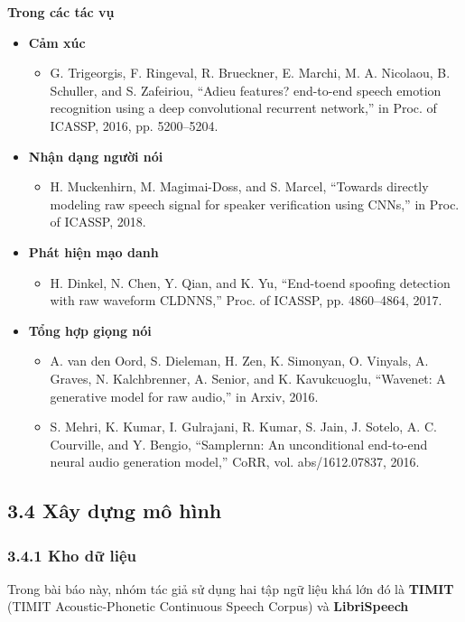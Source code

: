 \documentclass{article}
\begin{document}
	\textbf{Trong các tác vụ}
	\begin{itemize}
		\item \textbf{Cảm xúc}
		\begin{itemize}
			\item G. Trigeorgis, F. Ringeval, R. Brueckner, E. Marchi,
			M. A. Nicolaou, B. Schuller, and S. Zafeiriou, “Adieu
			features? end-to-end speech emotion recognition using
			a deep convolutional recurrent network,” in Proc. of
			ICASSP, 2016, pp. 5200–5204.
		\end{itemize}
		\item \textbf{Nhận dạng người nói}
		\begin{itemize}
			\item H. Muckenhirn, M. Magimai-Doss, and S. Marcel, “Towards directly modeling raw speech signal for speaker
			verification using CNNs,” in Proc. of ICASSP, 2018.
		\end{itemize}
		\item \textbf{Phát hiện mạo danh}
		\begin{itemize}
			\item H. Dinkel, N. Chen, Y. Qian, and K. Yu, “End-toend spoofing detection with raw waveform CLDNNS,”
			Proc. of ICASSP, pp. 4860–4864, 2017.
		\end{itemize}
		\item \textbf{Tổng hợp giọng nói}
		\begin{itemize}
			\item A. van den Oord, S. Dieleman, H. Zen, K. Simonyan,
			O. Vinyals, A. Graves, N. Kalchbrenner, A. Senior, and
			K. Kavukcuoglu, “Wavenet: A generative model for raw
			audio,” in Arxiv, 2016.
			\item S. Mehri, K. Kumar, I. Gulrajani, R. Kumar, S. Jain,
			J. Sotelo, A. C. Courville, and Y. Bengio, “Samplernn:
			An unconditional end-to-end neural audio generation
			model,” CoRR, vol. abs/1612.07837, 2016.
		\end{itemize}
	\end{itemize}
	
	\subsection{3.4 Xây dựng mô hình}
	
	\subsubsection{3.4.1 Kho dữ liệu}
	\qquad Trong bài báo này, nhóm tác giả sử dụng hai tập ngữ liệu khá lớn đó là \textbf{TIMIT} (TIMIT Acoustic-Phonetic Continuous Speech Corpus) và \textbf{LibriSpeech}
	
\end{document}
